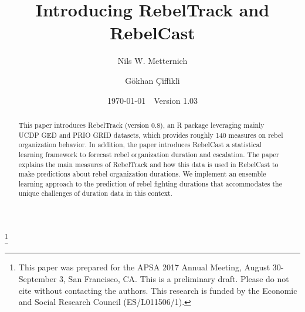 \documentclass[11pt,oneside,fullpage]{amsart}
\begin{document}
\title[RebelTrack / RebelCast]{Introducing RebelTrack and RebelCast}
\thanks{This paper was prepared for the APSA 2017 Annual Meeting, August 30- September 3, San Francisco, CA. This is a preliminary draft. Please do not cite without contacting the authors. This research is funded by the Economic and Social Research Council (ES/L011506/1).}

 

\author{Nils W. Metternich}
\address{Nils W. Metternich: Department of Political Science}


\author{G{\"o}khan \c{C}\.{i}fl\.{i}kl\.{i}}
\address{Gokhan Ciflikli: Department of International Relations}



\date{\today~~Version 1.03}
\maketitle

\begin{abstract}
This paper introduces RebelTrack (version 0.8), an R package leveraging mainly UCDP GED and PRIO GRID  datasets, which provides roughly 140 measures on rebel organization behavior. In addition, the paper introduces RebelCast a statistical learning framework to forecast rebel organization duration and escalation. The paper explains the main measures of RebelTrack and how this data is used in RebelCast to make predictions about rebel organization durations. We implement an ensemble learning approach to the prediction of rebel fighting durations that accommodates the unique challenges of duration data in this context. 
\end{abstract}

\end{document}
